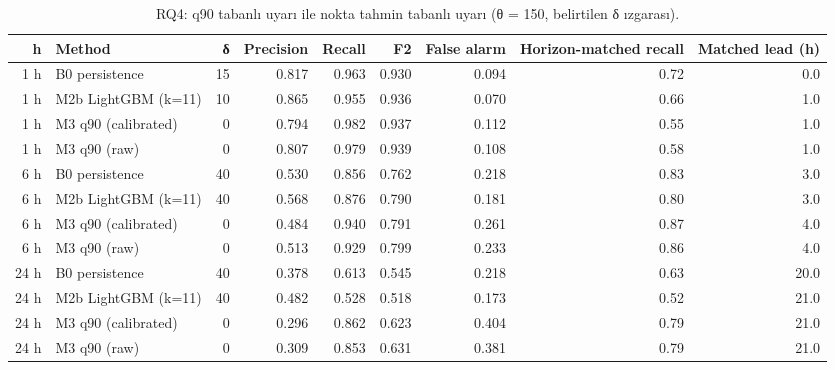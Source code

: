 \begin{table}[t]
\caption{RQ4: q90 tabanlı uyarı ile nokta tahmin tabanlı uyarı (θ = 150, belirtilen δ ızgarası).}
\label{tab:rq4_warning}
\centering\footnotesize
\begin{tabular}{rlrrrrrrr}
\toprule
h & Method & δ & Precision & Recall & F2 & False alarm & Horizon-matched recall & Matched lead (h) \\
\midrule
1 h & B0 persistence & 15 & 0.817 & 0.963 & 0.930 & 0.094 & 0.72 & 0.0 \\
1 h & M2b LightGBM (k=11) & 10 & 0.865 & 0.955 & 0.936 & 0.070 & 0.66 & 1.0 \\
1 h & M3 q90 (calibrated) & 0 & 0.794 & 0.982 & 0.937 & 0.112 & 0.55 & 1.0 \\
1 h & M3 q90 (raw) & 0 & 0.807 & 0.979 & 0.939 & 0.108 & 0.58 & 1.0 \\
6 h & B0 persistence & 40 & 0.530 & 0.856 & 0.762 & 0.218 & 0.83 & 3.0 \\
6 h & M2b LightGBM (k=11) & 40 & 0.568 & 0.876 & 0.790 & 0.181 & 0.80 & 3.0 \\
6 h & M3 q90 (calibrated) & 0 & 0.484 & 0.940 & 0.791 & 0.261 & 0.87 & 4.0 \\
6 h & M3 q90 (raw) & 0 & 0.513 & 0.929 & 0.799 & 0.233 & 0.86 & 4.0 \\
24 h & B0 persistence & 40 & 0.378 & 0.613 & 0.545 & 0.218 & 0.63 & 20.0 \\
24 h & M2b LightGBM (k=11) & 40 & 0.482 & 0.528 & 0.518 & 0.173 & 0.52 & 21.0 \\
24 h & M3 q90 (calibrated) & 0 & 0.296 & 0.862 & 0.623 & 0.404 & 0.79 & 21.0 \\
24 h & M3 q90 (raw) & 0 & 0.309 & 0.853 & 0.631 & 0.381 & 0.79 & 21.0 \\
\bottomrule
\end{tabular}
\end{table}
